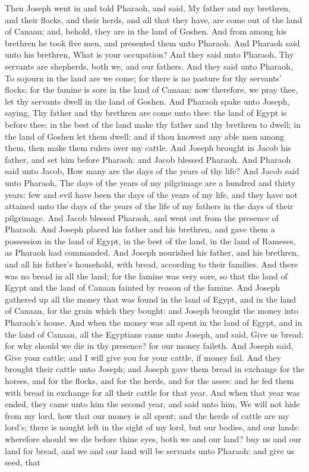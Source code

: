 Then Joseph went in and told Pharaoh, and said, My father and my brethren, and their flocks, and their herds, and all that they have, are come out of the land of Canaan; and, behold, they are in the land of Goshen. And from among his brethren he took five men, and presented them unto Pharaoh. And Pharaoh said unto his brethren, What is your occupation? And they said unto Pharaoh, Thy servants are shepherds, both we, and our fathers. And they said unto Pharaoh, To sojourn in the land are we come; for there is no pasture for thy servants’ flocks; for the famine is sore in the land of Canaan: now therefore, we pray thee, let thy servants dwell in the land of Goshen. And Pharaoh spake unto Joseph, saying, Thy father and thy brethren are come unto thee: the land of Egypt is before thee; in the best of the land make thy father and thy brethren to dwell; in the land of Goshen let them dwell: and if thou knowest any able men among them, then make them rulers over my cattle. And Joseph brought in Jacob his father, and set him before Pharaoh: and Jacob blessed Pharaoh. And Pharaoh said unto Jacob, How many are the days of the years of thy life? And Jacob said unto Pharaoh, The days of the years of my pilgrimage are a hundred and thirty years: few and evil have been the days of the years of my life, and they have not attained unto the days of the years of the life of my fathers in the days of their pilgrimage. And Jacob blessed Pharaoh, and went out from the presence of Pharaoh. And Joseph placed his father and his brethren, and gave them a possession in the land of Egypt, in the best of the land, in the land of Rameses, as Pharaoh had commanded. And Joseph nourished his father, and his brethren, and all his father’s household, with bread, according to their families.  And there was no bread in all the land; for the famine was very sore, so that the land of Egypt and the land of Canaan fainted by reason of the famine. And Joseph gathered up all the money that was found in the land of Egypt, and in the land of Canaan, for the grain which they bought: and Joseph brought the money into Pharaoh’s house. And when the money was all spent in the land of Egypt, and in the land of Canaan, all the Egyptians came unto Joseph, and said, Give us bread: for why should we die in thy presence? for our money faileth. And Joseph said, Give your cattle; and I will give you for your cattle, if money fail. And they brought their cattle unto Joseph; and Joseph gave them bread in exchange for the horses, and for the flocks, and for the herds, and for the asses: and he fed them with bread in exchange for all their cattle for that year. And when that year was ended, they came unto him the second year, and said unto him, We will not hide from my lord, how that our money is all spent; and the herds of cattle are my lord’s; there is nought left in the sight of my lord, but our bodies, and our lands: wherefore should we die before thine eyes, both we and our land? buy us and our land for bread, and we and our land will be servants unto Pharaoh: and give us seed, that 